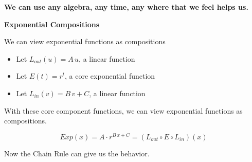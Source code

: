 \documentclass{ximera}
\begin{document}
\begin{center}
\textbf{\textcolor{red!70!black}{We can use any algebra, any time, any where that we feel helps us.}}  
\end{center}



\begin{idea}  \textbf{\textcolor{blue!55!black}{Exponential Compositions}} 

We can view exponential functions as compositions


\begin{itemize}
\item Let $L_{out}(u) = A \, u $, a linear function
\item Let $E(t) = r^t$, a core exponential function
\item Let $L_{in}(v) = B \, v + C$, a linear function
\end{itemize}

With these core component functions, we can view exponential functions as compositions.


\[  Exp(x) =    A \cdot r^{B \, x + C} = (L_{out} \circ E \circ L_{in})(x) \]


Now the Chain Rule can give us the behavior.

\end{idea}
\end{document}
